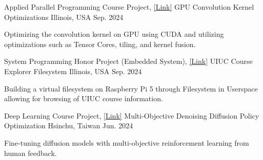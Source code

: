 

\begin{cventries}
  \cventry
    {Applied Parallel Programming Course Project, \href{https://github.com/KJLdefeated/UIUC_Applied_Parallel_Programming/blob/main/Project/README_m3.md}{\underline{[Link]}}} 
    {GPU Convolution Kernel Optimizations} 
    {Illinois, USA} 
    {Sep. 2024} 
    {
      \begin{cvitems} %
        \item {Optimizing the convolution kernel on GPU using CUDA and utilizing optimizations such as Tensor Cores, tiling, and kernel fusion.}
      \end{cvitems}
    }

  \cventry
    {System Programming Honor Project (Embedded System), \href{https://github.com/krishp2005/341Honors}{\underline{[Link]}}} 
    {UIUC Course Explorer Filesystem} 
    {Illinois, USA} 
    {Sep. 2024} 
    {
      \begin{cvitems} %
        \item {Building a virtual filesystem on Raspberry Pi 5 through Filesystem in Userspace allowing for browsing of UIUC course information.}
      \end{cvitems}
    }

  \cventry
    {Deep Learning Course Project, \href{https://github.com/KJLdefeated/MODDPO}{\underline{[Link]}}} 
    {Multi-Objective Denoising Diffusion Policy Optimization} 
    {Hsinchu, Taiwan} 
    {Jun. 2024} 
    {
      \begin{cvitems} %
        \item {Fine-tuning diffusion models with multi-objective reinforcement learning from human feedback.}
      \end{cvitems}
    }


\end{cventries}
